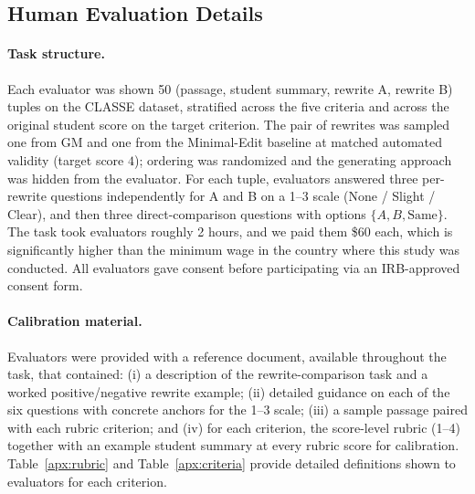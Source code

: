 \documentclass[letterpaper]{article} %
\begin{document}
\subsection{Human Evaluation Details} \label{sec:apdx-human-eval}


\paragraph{Task structure.} Each evaluator was shown 50 (passage, student summary, rewrite A, rewrite B) tuples on the CLASSE dataset, stratified across the five criteria and across the original student score on the target criterion. The pair of rewrites was sampled one from GM and one from the Minimal-Edit baseline at matched automated validity (target score $4$); ordering was randomized and the generating approach was hidden from the evaluator. For each tuple, evaluators answered three per-rewrite questions independently for A and B on a 1--3 scale (None / Slight / Clear), and then three direct-comparison questions with options $\{A, B, \text{Same}\}$. The task took evaluators roughly 2 hours, and we paid them \$60 each, which is significantly higher than the minimum wage in the country where this study was conducted. All evaluators gave consent before participating via an IRB-approved consent form.

\paragraph{Calibration material.} Evaluators were provided with a reference document, available throughout the task, that contained: (i) a description of the rewrite-comparison task and a worked positive/negative rewrite example; (ii) detailed guidance on each of the six questions with concrete anchors for the 1--3 scale; (iii) a sample passage paired with each rubric criterion; and (iv) for each criterion, the score-level rubric (1--4) together with an example student summary at every rubric score for calibration. Table~\ref{apx:rubric} and Table~\ref{apx:criteria} provide detailed definitions shown to evaluators for each criterion.
\end{document}
